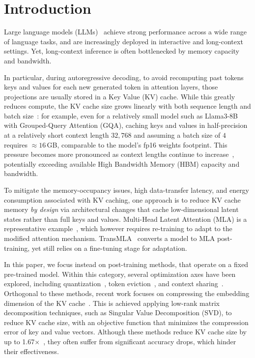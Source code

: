 \section{Introduction}
\label{sec:intro}
Large language models (LLMs)~\cite{touvron2023llama2openfoundation, grattafiori2024llama3herdmodels} achieve strong performance across a wide range of language tasks, and are increasingly deployed in interactive and long-context settings.
Yet, long-context inference is often bottlenecked by memory capacity and bandwidth.

In particular, during autoregressive decoding, to avoid recomputing past tokens keys and values for each new generated token in attention layers, those projections are usually stored in a Key Value (KV) cache.
% 
While this greatly reduces compute, the KV cache size grows linearly with both sequence length and batch size~\cite{scalingLLM}: for example, even for a relatively small model such as Llama3-8B with Grouped-Query Attention (GQA), caching keys and values in half-precision at a relatively short context length $32{,}768$ and assuming a batch size of $4$ requires $\approx 16$\,GB, comparable to the model's fp16 weights footprint. This pressure becomes more pronounced as context lengths continue to increase~\cite{openrouter}, potentially exceeding available High Bandwidth Memory (HBM) capacity and bandwidth.

To mitigate the memory-occupancy issues, high data-transfer latency, and energy consumption associated with KV caching, one approach is to reduce KV cache memory \emph{by design} via architectural changes that cache low-dimensional latent states rather than full keys and values.
Multi-Head Latent Attention (MLA) is a representative example~\cite{deepseekv2}, which however requires re-training to adapt to the modified attention mechanism.
TransMLA~\cite{transmla} converts a model to MLA post-training, yet still relies on a fine-tuning stage for adaptation.

In this paper, we focus instead on post-training methods, that operate on a fixed pre-trained model. %
Within this category, several optimization axes have been explored, including quantization~\cite{hooper2024kvquant, LiuIcml24}, token eviction~\cite{streamingLLM, h2o}, and context sharing~\cite{ZhengNips24}. Orthogonal to these methods, recent work focuses on compressing the embedding dimension of the KV cache~\cite{asvd, chang2025palu, saxena2024eigenattention}. This is achieved applying low-rank matrix decomposition techniques, such as Singular Value Decomposition (SVD), to reduce KV cache size, with an objective function that minimizes the compression error of key and value vectors. Although these methods reduce KV cache size by up to 1.67$\times$~\cite{saxena2024eigenattention}, they often suffer from significant accuracy drops, which hinder their effectiveness.

